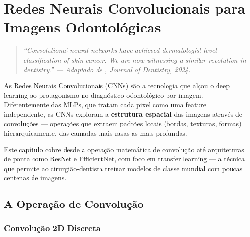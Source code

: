 
\chapter{Redes Neurais Convolucionais para Imagens Odontológicas}
\label{cap:cnns-imagens}

\niveltres

\begin{quote}
\itshape\small
``Convolutional neural networks have achieved dermatologist-level classification
of skin cancer. We are now witnessing a similar revolution in dentistry.''
--- Adaptado de , Journal of Dentistry, 2024.
\end{quote}

As Redes Neurais Convolucionais (CNNs) são a tecnologia que alçou o deep learning
ao protagonismo no diagnóstico odontológico por imagem. Diferentemente das MLPs,
que tratam cada pixel como uma feature independente, as CNNs exploram a
\textbf{estrutura espacial} das imagens através de convoluções --- operações que
extraem padrões locais (bordas, texturas, formas) hierarquicamente, das camadas
mais rasas às mais profundas.

Este capítulo cobre desde a operação matemática de convolução até arquiteturas
de ponta como ResNet e EfficientNet, com foco em transfer learning --- a técnica
que permite ao cirurgião-dentista treinar modelos de classe mundial com poucas
centenas de imagens.


\section{A Operação de Convolução}
\label{sec:convolucao}

\subsection{Convolução 2D Discreta}

